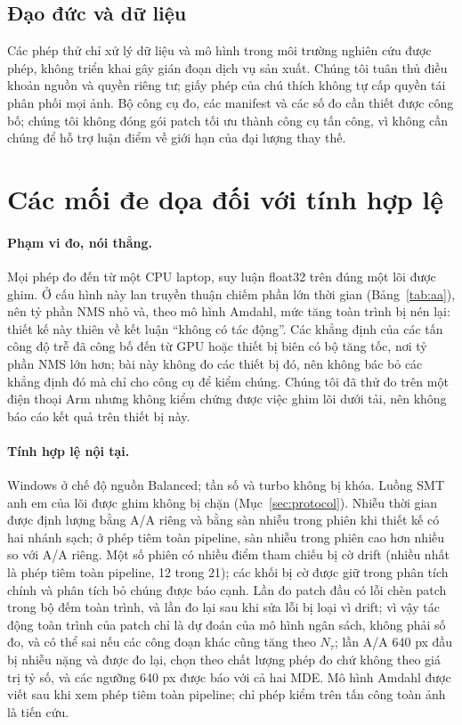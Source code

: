 \documentclass[a4paper,fleqn]{cas-dc}
\newcommand{\Ntau}{N_{\tau}}
\begin{document}
\subsection{Đạo đức và dữ liệu}
Các phép thử chỉ xử lý dữ liệu và mô hình trong môi trường nghiên cứu được phép, không triển khai gây gián đoạn dịch vụ sản xuất. Chúng tôi tuân thủ điều khoản nguồn và quyền riêng tư; giấy phép của chú thích không tự cấp quyền tái phân phối mọi ảnh. Bộ công cụ đo, các manifest và các số đo cần thiết được công bố; chúng tôi không đóng gói patch tối ưu thành công cụ tấn công, vì không cần chúng để hỗ trợ luận điểm về giới hạn của đại lượng thay thế.

\section{Các mối đe dọa đối với tính hợp lệ}
\label{sec:threats}
\paragraph{Phạm vi đo, nói thẳng.}
Mọi phép đo đến từ một CPU laptop, suy luận float32 trên đúng một lõi được ghim. Ở cấu hình này lan truyền thuận chiếm phần lớn thời gian (Bảng~\ref{tab:aa}), nên tỷ phần NMS nhỏ và, theo mô hình Amdahl, mức tăng toàn trình bị nén lại: thiết kế này thiên về kết luận ``không có tác động''. Các khẳng định của các tấn công độ trễ đã công bố đến từ GPU hoặc thiết bị biên có bộ tăng tốc, nơi tỷ phần NMS lớn hơn; bài này không đo các thiết bị đó, nên không bác bỏ các khẳng định đó mà chỉ cho công cụ để kiểm chúng. Chúng tôi đã thử đo trên một điện thoại Arm nhưng không kiểm chứng được việc ghim lõi dưới tải, nên không báo cáo kết quả trên thiết bị này.
\paragraph{Tính hợp lệ nội tại.}
Windows ở chế độ nguồn Balanced; tần số và turbo không bị khóa. Luồng SMT anh em của lõi được ghim không bị chặn (Mục~\ref{sec:protocol}). Nhiễu thời gian được định lượng bằng A/A riêng và bằng sàn nhiễu trong phiên khi thiết kế có hai nhánh sạch; ở phép tiêm toàn pipeline, sàn nhiễu trong phiên cao hơn nhiều so với A/A riêng. Một số phiên có nhiều điểm tham chiếu bị cờ drift (nhiều nhất là phép tiêm toàn pipeline, 12 trong 21); các khối bị cờ được giữ trong phân tích chính và phân tích bỏ chúng được báo cạnh. Lần đo patch đầu có lỗi chèn patch trong bộ đếm toàn trình, và lần đo lại sau khi sửa lỗi bị loại vì drift; vì vậy tác động toàn trình của patch chỉ là dự đoán của mô hình ngân sách, không phải số đo, và có thể sai nếu các công đoạn khác cũng tăng theo $\Ntau$; lần A/A 640 px đầu bị nhiễu nặng và được đo lại, chọn theo chất lượng phép đo chứ không theo giá trị tỷ số, và các ngưỡng 640 px được báo với cả hai MDE. Mô hình Amdahl được viết sau khi xem phép tiêm toàn pipeline; chỉ phép kiểm trên tấn công toàn ảnh là tiến cứu.
\end{document}
